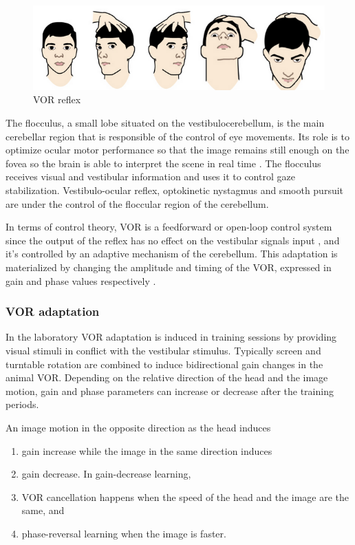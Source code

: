 \documentclass[12pt, a4paper,twoside]{tesi_upf}
\begin{document}
\begin{figure}
  \centering
  \includegraphics[scale=0.50]{images/vor.png}
  \caption[VOR reflex]{VOR reflex}
\end{figure}

The flocculus, a small lobe situated on the vestibulocerebellum, is the main cerebellar region that is responsible of the control of eye movements. Its role is to optimize ocular motor performance so that the image remains still enough on the fovea so the brain is able to interpret the scene in real time \cite{Kheradmand2011}. The flocculus receives visual and vestibular information and uses it to control gaze stabilization. Vestibulo-ocular reflex, optokinetic nystagmus and smooth pursuit are under the control of the floccular region of the cerebellum.

In terms of control theory, VOR is a feedforward or open-loop control system since the output of the reflex has no effect on the vestibular signals input \cite{Porrill2007}, and it's controlled by an adaptive mechanism of the cerebellum. This adaptation is materialized by changing the amplitude and timing of the VOR, expressed in gain and phase values respectively \cite{DeZeeuw2005}.

\subsubsection{VOR adaptation}

In the laboratory VOR adaptation is induced in training sessions by providing visual stimuli in conflict with the vestibular stimulus. Typically screen and turntable rotation are combined to induce bidirectional gain changes in the animal VOR. Depending on the relative direction of the head and the image motion, gain and phase parameters can increase or decrease after the training periods.

An image motion in the opposite direction as the head induces
\begin{enumerate}
\item gain increase while the image in the same direction induces
\item gain decrease. In gain-decrease learning,
\item VOR cancellation happens when the speed of the head and the image are the same, and
\item phase-reversal learning when the image is faster.
\end{enumerate}
\end{document}
